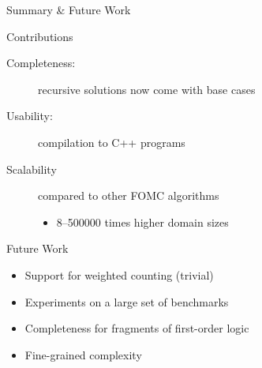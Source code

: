\documentclass{beamer}
\begin{document}
\begin{frame}{Summary \& Future Work}
  \begin{block}{Contributions}
    \begin{description}
      \item[Completeness:] recursive solutions now come with \alert{base cases}
      \item[Usability:] compilation to C++ programs
      \item[Scalability] compared to other FOMC algorithms
            \begin{itemize}
              \item \numrange{8}{500000} times higher domain sizes
            \end{itemize}
    \end{description}
  \end{block}
  \pause
  \begin{block}{Future Work}
    \begin{itemize}
      \item Support for weighted counting (trivial)
      \item Experiments on a large set of benchmarks
      \item Completeness for fragments of first-order logic
      \item Fine-grained complexity
    \end{itemize}
  \end{block}
\end{frame}
\end{document}
